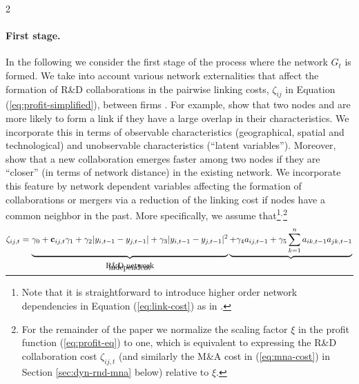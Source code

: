 \documentclass[12pt]{article}
\begin{document}
\begin{spacing}{2}
\paragraph{First stage.} In the following we consider the first stage of the process where the network $G_t$ is formed. We take into account various network externalities that affect the formation of R\&D collaborations in the pairwise linking costs, $\zeta_{ij}$ in Equation (\ref{eq:profit-simplified}), between firms \citep[cf.][]{powell05:_networ_dynam_field_evolut, gulati07:_manag_networ_resour, Gulati2010}. For example, \citet[][]{liben2003link} show that  two nodes  and are more likely to form a link if they have a large overlap in their characteristics. %
We incorporate this in terms of observable characteristics (geographical, spatial and technological) and unobservable characteristics (``latent variables''). Moreover, \citet[][]{Fafchamps2010} show that a new collaboration emerges faster among two nodes if they are ``closer'' (in terms of network distance) in the existing network. We incorporate this feature by network dependent variables affecting the formation of collaborations or mergers via a reduction of the linking cost if nodes have a common neighbor in the past. More specifically, we assume that\footnote{Note that it is straightforward to introduce higher order network dependencies in Equation (\ref{eq:link-cost}) as in \citet[][]{Fafchamps2010}.}${}^{,}$\footnote{For the remainder of the paper we normalize the scaling factor $\xi$ in the profit function (\ref{eq:profit-eq}) to one, which is equivalent to expressing the R\&D collaboration cost $\zeta_{ij,t}$ (and similarly the M\&A cost in (\ref{eq:mna-cost}) in Section \ref{sec:dyn-rnd-mna} below) relative to $\xi$.}
\begin{equation}
\zeta_{ij,t}
= 
\underbrace{
\phantom{\sum_k} \hspace{-0.5cm}
\gamma_0
+ \mathbf{c}_{ij,t} \gamma_1
+
\gamma_2 |y_{i,t-1}-y_{j,t-1}|
+
\gamma_3 |y_{i,t-1}-y_{j,t-1}|^2
}_{
\begin{array}{c}
\vspace{-0.35cm} \small \text{R\&D network} \\
\vspace{-0.35cm} \small \text{independent}
\end{array}
}
\underbrace{
+
\gamma_4 a_{ij,t-1}
+
\gamma_5 \sum_{k=1}^n a_{ik,t-1} a_{jk,t-1}
}
\end{equation}
\end{spacing}
\end{document}
